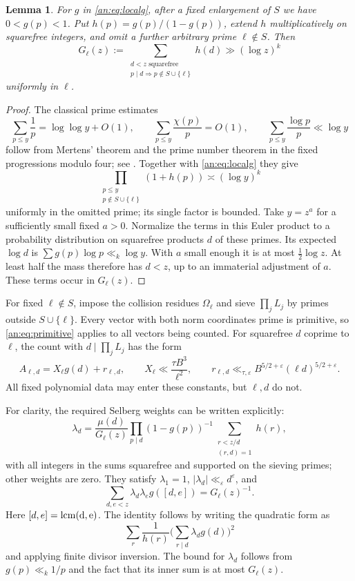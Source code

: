 \documentclass[11pt,reqno]{amsart}
\newtheorem{lemma}[theorem]{Lemma}
\theoremstyle{definition}
\numberwithin{equation}{section}
\newcommand{\lcm}{\operatorname{lcm}}
\def\bg{\bigg}
\def\({\bg(}
\def\){\bg)}
\def\lcm{\rm{lcm}}
\begin{document}
\begin{lemma}\label{an:lem:G}
For $g$ in \eqref{an:eq:localg}, after a fixed enlargement of $S$ we have $0<g(p)<1$. Put $h(p)=g(p)/(1-g(p))$, extend $h$ multiplicatively on squarefree integers, and omit a further arbitrary prime $\ell\notin S$. Then
\[
 G_\ell(z):=\sum_{\substack{d<z\text{ squarefree}\\p\mid d\Rightarrow p\notin S\cup\{\ell\}}}h(d)
 \gg (\log z)^k
\]
uniformly in $\ell$.
\end{lemma}
\begin{proof}
The classical prime estimates
\[
 \sum_{p\le y}\frac1p=\log\log y+O(1),\qquad
 \sum_{p\le y}\frac{\chi(p)}p=O(1),\qquad
 \sum_{p\le y}\frac{\log p}{p}\ll\log y
\]
follow from Mertens' theorem and the prime number theorem in the fixed progressions modulo four; see \cite{Dav}. Together with \eqref{an:eq:localg} they give
\[
 \prod_{\substack{p\le y\\p\notin S\cup\{\ell\}}}(1+h(p))\asymp(\log y)^k
\]
uniformly in the omitted prime; its single factor is bounded. Take $y=z^a$ for a sufficiently small fixed $a>0$. Normalize the terms in this Euler product to a probability distribution on squarefree products $d$ of these primes. Its expected $\log d$ is $\sum g(p)\log p\ll_k\log y$. With $a$ small enough it is at most $\tfrac12\log z$. At least half the mass therefore has $d<z$, up to an immaterial adjustment of $a$. These terms occur in $G_\ell(z)$.
\end{proof}

For fixed $\ell\notin S$, impose the collision residues $\Omega_\ell$ and sieve $\prod_jL_j$ by primes outside $S\cup\{\ell\}$. Every vector with both norm coordinates prime is primitive, so \eqref{an:eq:primitive} applies to all vectors being counted. For squarefree $d$ coprime to $\ell$, the count with $d\mid\prod_j L_j$ has the form
\begin{equation}\label{an:eq:sievesequence}
 A_{\ell,d}=X_\ell g(d)+r_{\ell,d},\qquad
 X_\ell\ll\frac{\tau B^3}{\ell^2},\qquad
 r_{\ell,d}\ll_{\tau,\varepsilon} B^{5/2+\varepsilon}(\ell d)^{5/2+\varepsilon}.
\end{equation}
All fixed polynomial data may enter these constants, but $\ell,d$ do not.

For clarity, the required Selberg weights can be written explicitly:
\[
 \lambda_d=\frac{\mu(d)}{G_\ell(z)}
   \prod_{p\mid d}(1-g(p))^{-1}
   \sum_{\substack{r<z/d\\(r,d)=1}}h(r),
\]
with all integers in the sums squarefree and supported on the sieving primes; other weights are zero. They satisfy $\lambda_1=1$, $|\lambda_d|\ll_\varepsilon d^\varepsilon$, and
\begin{equation}\label{an:eq:selbergmain}
 \sum_{d,e<z}\lambda_d\lambda_e g([d,e])=G_\ell(z)^{-1}.
\end{equation}
Here $[d,e]=\lcm(d,e)$. The identity follows by writing the quadratic form as
\[
 \sum_r\frac1{h(r)}
       \(\sum_{r\mid d}\lambda_dg(d)\)^2
\]
and applying finite divisor inversion. The bound for $\lambda_d$ follows from $g(p)\ll_k1/p$ and the fact that its inner sum is at most $G_\ell(z)$.
\end{document}
